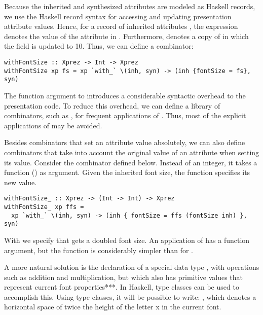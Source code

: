 Because the inherited and synthesized attributes are modeled as Haskell records, we use the Haskell record syntax for  accessing and updating presentation attribute values. Hence, for a record of inherited attributes , the expression  denotes the value of the  attribute in . Furthermore,  denotes a copy of  in which the  field is updated to 10. Thus, we can define a   combinator: 

\begin{small}
\begin{verbatim}
withFontSize :: Xprez -> Int -> Xprez
withFontSize xp fs = xp `with_` \(inh, syn) -> (inh {fontSize = fs}, syn)
\end{verbatim}
\end{small}

The function argument to  introduces a considerable syntactic overhead to the presentation code. To reduce this overhead, we can define a library of combinators, such as , for frequent applications of  . Thus, most of the explicit applications of  may be avoided.

Besides combinators that set an attribute value absolutely, we can also define combinators that take into account the original value of an attribute when setting its value. Consider the combinator  defined below. Instead of an integer, it takes a function () as argument. Given the inherited font size, the function  specifies its new value.

\begin{small}
\begin{verbatim}
withFontSize_ :: Xprez -> (Int -> Int) -> Xprez
withFontSize_ xp ffs = 
  xp `with_` \(inh, syn) -> (inh { fontSize = ffs (fontSize inh) }, syn)
\end{verbatim}
\end{small}

With  we specify that  gets a doubled font size. An application of  has a function argument, but the function is considerably simpler than for . 

\bc A more natural solution is the declaration of a special data type , with operations such as addition and multiplication, but which also has primitive values that represent current font properties***. In Haskell, type classes can be used to accomplish this. Using type classes, it will be possible to write: , which denotes a horizontal space of twice the height of the letter x in the current font.\ec 


